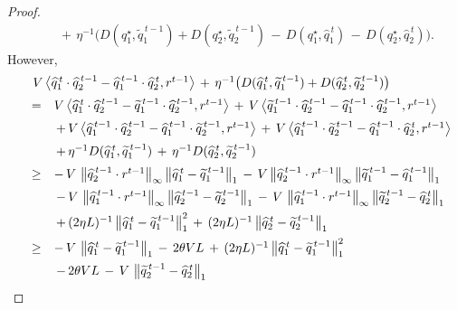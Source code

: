 \documentclass[12pt, final]{l4dc2023}
\begin{document}
\begin{proof}
\begin{equation}
\begin{array}{rcl}
	&& \,+\, \eta^{-1} \big(D( q_1^\star,\tilde q_1^{\,t-1}) + D( q_2^\star, \tilde q_2^{\,t-1}) \,-\, D( q_1^\star,\hat q_1^{\,t}) \,-\, D( q_2^\star, \hat q_2^{\,t}) \big).
	\end{array}
	\end{equation}
	However,
	\[
	\begin{array}{rcl}
	&& \!\!\!\! \!\!\!\! \!\! V\, \big\langle{\hat q_1^{\,t}\cdot \hat q_2^{\,t-1}- \hat q_1^{\,t-1}\cdot \hat q_2^{\,t}},{r^{t-1}}\big\rangle 
	\,+\, \eta^{-1} \big(D(\hat q_1^{\,t},\tilde q_1^{\,t-1}) + D(\hat q_2^{\,t}, \tilde q_2^{\,t-1})\big)
	\\[0.2cm]
	&=& V\, \big\langle{\hat q_1^{\,t}\cdot \hat q_2^{\,t-1}- \tilde q_1^{\,t-1}\cdot \hat q_2^{\,t-1}},{r^{t-1}}\big\rangle 
	\,+\,V\, \big\langle{ \tilde q_1^{\,t-1}\cdot \hat q_2^{\,t-1} - \hat q_1^{\,t-1}\cdot \hat q_2^{\,t-1}},{r^{t-1}}\big\rangle 
	\\[0.2cm]
	&&  
	\,+\,V\, \big\langle{ \hat q_1^{\,t-1}\cdot \hat q_2^{\,t-1} - \hat q_1^{\,t-1}\cdot \tilde q_2^{\,t-1}},{r^{t-1}}\big\rangle 
	\,+\, V\, \big\langle{\hat q_1^{\,t-1}\cdot \tilde q_2^{\,t-1}- \hat q_1^{\,t-1}\cdot \hat q_2^{\,t}},{r^{t-1}}\big\rangle 
	\\[0.2cm]
	&&  \,+\, \eta^{-1} D(\hat q_1^{\,t},\tilde q_1^{\,t-1}) \,+\, \eta^{-1} D(\hat q_2^{\,t}, \tilde q_2^{\,t-1})
	\\[0.2cm]
	&\geq&  -\,V\, \norm{\hat q_2^{\,t-1}\cdot r^{t-1} }_\infty \norm{\hat q_1^{\,t} - \tilde q_1^{\,t-1}}_1
	\,-\,V\norm{ \hat q_2^{\,t-1} \cdot r^{t-1} }_\infty\norm{ \tilde q_1^{\,t-1}- \hat q_1^{\,t-1}}_1
	\\[0.2cm]
	&& 
	\,-\,V\,\norm{ \hat q_1^{\,t-1}\cdot  r^{t-1} }_\infty\norm{ \hat q_2^{\,t-1} - \tilde q_2^{\,t-1}}_1
	\,-\, V\,\norm{ \hat q_1^{\,t-1}\cdot r^{t-1} }_\infty\norm{ \tilde q_2^{\,t-1}-\hat q_2^{\,t} }_1
	\\[0.2cm]
	&& \,+\, (2\eta L)^{-1}\norm{\hat q_1^{\,t}-\tilde q_1^{\,t-1}}_1^2 \,+\, (2\eta L)^{-1} \norm{\hat q_2^{\,t} - \tilde q_2^{\,t-1}}_1
	\\[0.2cm]
	&\geq&  -\,V\, \norm{\hat q_1^{\,t} - \tilde q_1^{\,t-1}}_1
	\,-\, 2\theta V L
	\,+\, (2\eta L)^{-1}\norm{\hat q_1^{\,t}-\tilde q_1^{\,t-1}}_1^2
	\\[0.2cm]
	&& 
	\,-\,2\theta VL
	\,-\, V\,\norm{ \tilde q_2^{\,t-1}-\hat q_2^{\,t} }_1

\end{array}\]
\end{proof}
\end{document}
